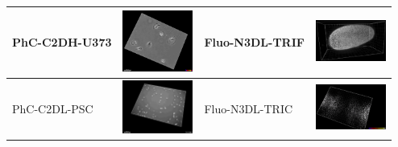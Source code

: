 \documentclass[./dissertation.tex]{subfiles}
\begin{document}
\begin{table}[!ht]
\begin{tabular}{|l|c|l|c|}
    PhC-C2DH-U373            & \includegraphics[width=2.3cm]{figures/ctc/PhC-C2DH-U373.png}   & Fluo-N3DL-TRIF           & \includegraphics[width=2.3cm]{figures/ctc/Fluo-N3DL-TRIF.png}     \\ \hline
    PhC-C2DL-PSC             & \includegraphics[width=2.3cm]{figures/ctc/PhC-C2DL-PSC.png}    & Fluo-N3DL-TRIC           & \includegraphics[width=2.3cm]{figures/ctc/Fluo-N3DL-TRIC.png}     \\ \hline
  \end{tabular}
\end{table}
\end{document}
